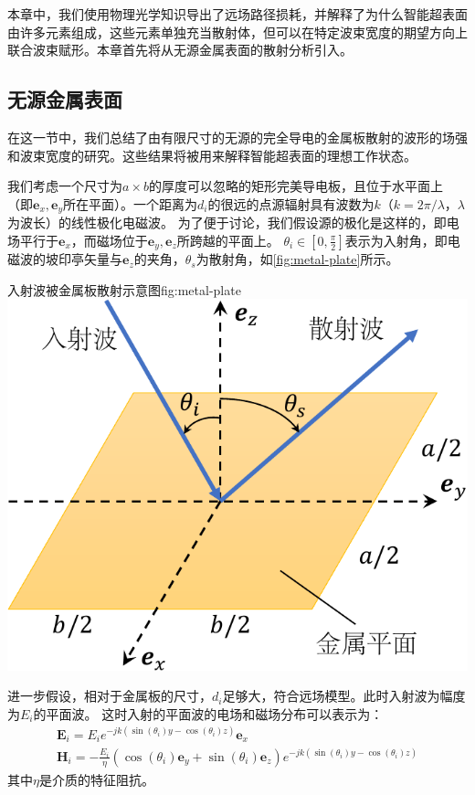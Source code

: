 \documentclass[supercite]{HustGraduPaper}
\begin{document}
本章中，我们使用物理光学知识导出了远场路径损耗\cite{emil2019intelligent}，并解释了为什么智能超表面由许多元素组成，这些元素单独充当散射体，但可以在特定波束宽度的期望方向上联合波束赋形。本章首先将从无源金属表面的散射分析引入。

\subsection{无源金属表面}\label{subsec:metal-plate}

在这一节中，我们总结了由有限尺寸的无源的完全导电的金属板散射的波形的场强和波束宽度的研究。这些结果将被用来解释智能超表面的理想工作状态。

我们考虑一个尺寸为$a \times b$的厚度可以忽略的矩形完美导电板，且位于水平面上（即$\boldsymbol{e}_{x}, \boldsymbol{e}_{y}$所在平面）。一个距离为$d_i$的很远的点源辐射具有波数为$k$（$k = 2\pi / \lambda$，$\lambda$为波长）的线性极化电磁波。
为了便于讨论，我们假设源的极化是这样的，即电场平行于$\boldsymbol{e}_{x}$，而磁场位于$\boldsymbol{e}_{y}, \boldsymbol{e}_{z}$所跨越的平面上。
$\theta_{i} \in\left[0, \frac{\pi}{2}\right]$表示为入射角，即电磁波的坡印亭矢量与$\boldsymbol{e}_{z}$的夹角，$\theta_{s}$为散射角，如\autoref{fig:metal-plate}所示。

\begin{generalfig}[htb]{入射波被金属板散射示意图}{fig:metal-plate}
	\includegraphics[width=0.5\linewidth]{Figures/metal-plate.pdf}
\end{generalfig}

进一步假设，相对于金属板的尺寸，$d_i$足够大，符合远场模型。此时入射波为幅度为$E_i$的平面波。
这时入射的平面波的电场和磁场分布可以表示为：
\begin{equation}
	\begin{array}{l}
		\mathbf{E}_{i}=E_{i} e^{-j k\left(\sin \left(\theta_{i}\right) y-\cos \left(\theta_{i}\right) z\right)} \boldsymbol{e}_{x} \\
		\mathbf{H}_{i}=-\frac{E_{i}}{\eta}\left(\cos \left(\theta_{i}\right) \boldsymbol{e}_{y}+\sin \left(\theta_{i}\right) \boldsymbol{e}_{z}\right) e^{-j k\left(\sin \left(\theta_{i}\right) y-\cos \left(\theta_{i}\right) z\right)}
	\end{array}
	\label{eq:e-field}
\end{equation}
其中$\eta$是介质的特征阻抗。
\end{document}
